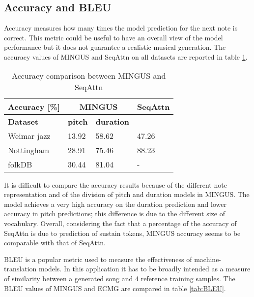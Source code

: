 \documentclass{article}
\begin{document}
\subsection{Accuracy and BLEU}
Accuracy measures how many times the model prediction for the next note is correct. This metric could be useful to have an overall view of the model performance but it does not guarantee a realistic musical generation. The accuracy values of MINGUS and SeqAttn on all datasets are reported in table \ref{tab:accuracy}.

\begin{table}[htbp]
	\caption{Accuracy comparison between MINGUS and SeqAttn}
	\begin{center}
		\begin{tabular}{ p{2.2cm} p{2cm} p{2cm} p{2cm}  }
             \hline
             Accuracy [\%] &  
             \multicolumn{2}{c}{\textbf{MINGUS}} & 
             \textbf{SeqAttn} \\
             \hline
             \textbf{Dataset} &  
             \textbf{pitch} & 
             \textbf{duration} & \\
             \hline
             \hline
             Weimar jazz & 13.92 & 58.62 & 47.26 \\
             Nottingham & 28.91 & 75.46 & 88.23 \\
             folkDB & 30.44 & 81.04 & - \\
             \hline
    \end{tabular}
	\label{tab:accuracy}
	\end{center}
\end{table}

It is difficult to compare the accuracy results because of the different note representation and of the division of pitch and duration models in MINGUS. The model achieves a very high accuracy on the duration prediction and lower accuracy in pitch predictions; this difference is due to the different size of vocabulary. Overall, considering the fact that a percentage of the accuracy of SeqAttn is due to prediction of sustain tokens, MINGUS accuracy seems to be comparable with that of SeqAttn.

BLEU is a popular metric used to measure the effectiveness of machine-translation models. In this application it has to be broadly intended as a measure of similarity between a generated song and 4 reference training samples. The BLEU values of MINGUS and ECMG are compared in table \ref{tab:BLEU}. 
\end{document}
